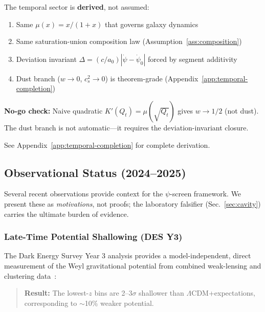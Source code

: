 \begin{tcolorbox}[colback=blue!5!white, colframe=blue!60!black, title={Dust Branch from Microsector: Not Bolted-On K-Essence}]
The temporal sector is \textbf{derived}, not assumed:
\begin{enumerate}[nosep]
\item Same $\mu(x) = x/(1+x)$ that governs galaxy dynamics
\item Same saturation-union composition law (Assumption~\ref{ass:composition})
\item Deviation invariant $\Delta = (c/a_0)|\dot\psi - \dot\psi_0|$ forced by segment additivity
\item Dust branch ($w \to 0$, $c_s^2 \to 0$) is theorem-grade (Appendix~\ref{app:temporal-completion})
\end{enumerate}
\textbf{No-go check:} Naive quadratic $K'(Q_t) = \mu(\sqrt{Q_t})$ gives $w \to 1/2$ (not dust). The dust branch is not automatic---it requires the deviation-invariant closure.

See Appendix~\ref{app:temporal-completion} for complete derivation.
\end{tcolorbox}



\subsection{Observational Status (2024--2025)}\label{sec:obs-status}

Several recent observations provide context for the $\psi$-screen framework. 
We present these as \textit{motivations}, not proofs; the laboratory 
falsifier (Sec.~\ref{sec:cavity}) carries the ultimate burden of evidence.

\subsubsection{Late-Time Potential Shallowing (DES Y3)}

The Dark Energy Survey Year 3 analysis provides a model-independent, direct 
measurement of the Weyl gravitational potential from combined weak-lensing 
and clustering data~\cite{DES2024Weyl}:

\begin{quote}
\textbf{Result:} The lowest-$z$ bins are 2--3$\sigma$ shallower than 
$\Lambda$CDM+\GR expectations, corresponding to $\sim$10\% weaker potential.
\end{quote}

